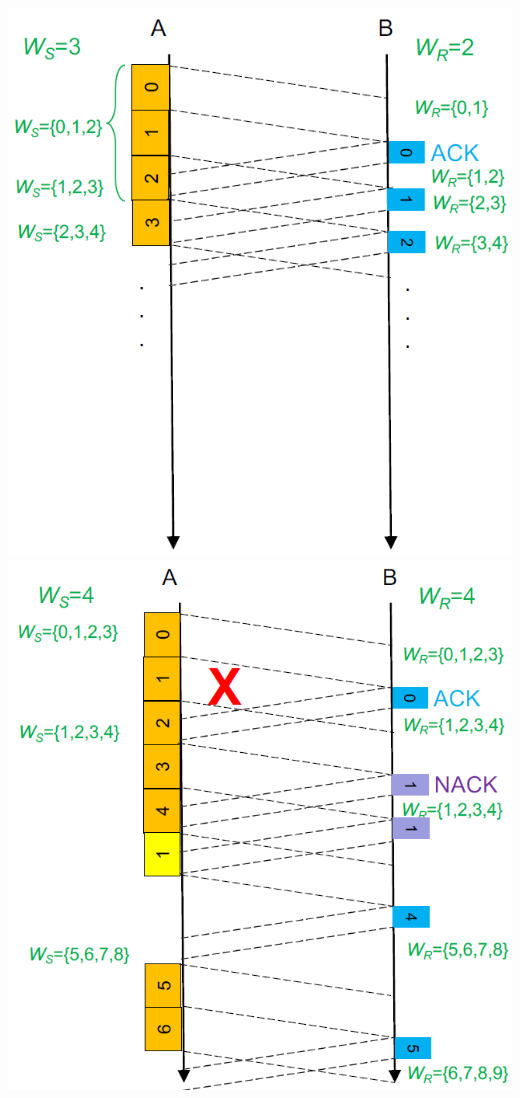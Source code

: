 \documentclass[12pt]{article}
\begin{document}
\begin{center}
    \includegraphics[scale=0.2]{selective_repeat}
    \includegraphics[scale=0.2]{selective_repeat_frame_error}
\end{center}
\end{document}
